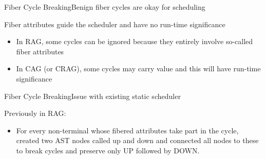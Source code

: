 % 

\begin{frame}{Fiber Cycle Breaking}{Benign fiber cycles are okay for scheduling}

\alert{Fiber attributes} guide the scheduler and have no run-time significance

\newlinevspace

\begin{itemize}
    \item %
In RAG, some cycles can be ignored because they entirely involve so-called fiber attributes

\newlinevspace

    \item In CAG (or CRAG), some cycles may \alert{carry value} and this will have run-time significance
\end{itemize}
\end{frame}




\begin{frame}{Fiber Cycle Breaking}{Issue with existing static scheduler}

Previously in RAG:
\begin{itemize}
    \item For every non-terminal whose fibered attributes take part in the cycle, created two \alert{AST nodes} called up and down and connected all nodes to these to break cycles and \alert{preserve only UP followed by DOWN}.
\end{itemize}


\end{frame}




